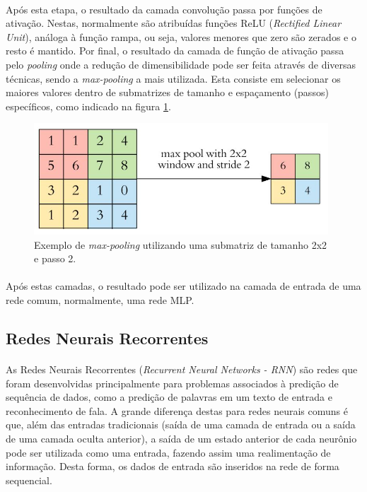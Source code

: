 \documentclass[grad,numbers]{coppe}
\begin{document}
  		\paragraph{}Após esta etapa, o resultado da camada convolução passa por funções de ativação. Nestas, normalmente são atribuídas funções ReLU (\textit{Rectified Linear Unit}), análoga à função rampa, ou seja, valores menores que zero são zerados e o resto é mantido. Por final, o resultado da camada de função de ativação passa pelo \textit{pooling} onde a redução de dimensibilidade pode ser feita através de diversas técnicas, sendo a \textit{max-pooling} a mais utilizada. Esta consiste em selecionar os maiores valores dentro de submatrizes de tamanho e espaçamento (passos) específicos, como indicado na figura \ref{fig:pooling-fig}.
  		\begin{figure}[h]
  			\centering
  			\includegraphics[width=11cm]{pooling.jpg}
  			\caption{Exemplo de \textit{max-pooling} utilizando uma submatriz de tamanho 2x2 e passo 2\cite{kernel-example}.}
  			\label{fig:pooling-fig}
  		\end{figure}
  		\paragraph{}Após estas camadas, o resultado pode ser utilizado na camada de entrada de uma rede comum, normalmente, uma rede MLP.
	  \subsection{Redes Neurais Recorrentes}
	  	\paragraph{}As Redes Neurais Recorrentes (\textit{Recurrent Neural Networks - RNN}) são redes que foram desenvolvidas principalmente para problemas associados à predição de sequência de dados, como a predição de palavras em um texto de entrada e reconhecimento de fala\cite{rnn-on-speech}. A grande diferença destas para redes neurais comuns é que, além das entradas tradicionais (saída de uma camada de entrada ou a saída de uma camada oculta anterior), a saída de um estado anterior de cada neurônio pode ser utilizada como uma entrada, fazendo assim uma realimentação de informação. Desta forma, os dados de entrada são inseridos na rede de forma sequencial.
\end{document}
